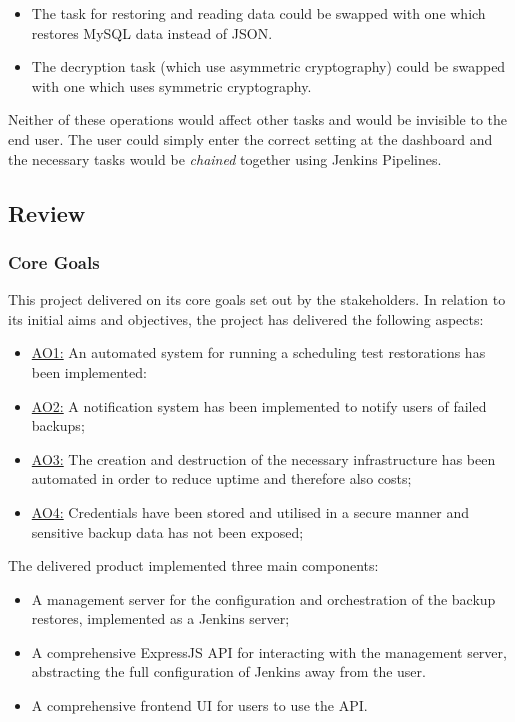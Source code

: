   \begin{itemize}
    \item The task for restoring and reading data could be swapped with one which restores MySQL data instead of JSON.
    \item The decryption task (which use asymmetric cryptography) could be swapped with one which uses symmetric cryptography. 
  \end{itemize}
  Neither of these operations would affect other tasks and would be invisible to the end user.  The user could simply enter the correct setting at the dashboard and the necessary tasks would be \textit{chained} together using Jenkins Pipelines. 

	\subsection{Review}
  
  \subsubsection{Core Goals}
	This project delivered on its core goals set out by the stakeholders. In relation to its initial aims and objectives, the project has delivered the following aspects:
  
  \begin{itemize}
    \item \hyperref[ao1]{AO1:} An automated system for running a scheduling test restorations has been implemented:
    \item \hyperref[ao2]{AO2:} A notification system has been implemented to notify users of failed backups;
    \item \hyperref[ao3]{AO3:} The creation and destruction of the necessary infrastructure has been automated in order to reduce uptime and therefore also costs;
    \item \hyperref[ao4]{AO4:} Credentials have been stored and utilised in a secure manner and sensitive backup data has not been exposed;
  \end{itemize}
  
  The delivered product implemented three main components:
  \begin{itemize}
    \item A management server for the configuration and orchestration of the backup restores, implemented as a Jenkins server;
    \item A comprehensive ExpressJS API for interacting with the management server, abstracting the full configuration of Jenkins away from the user.
    \item A comprehensive frontend UI for users to use the API.
  \end{itemize}
  
